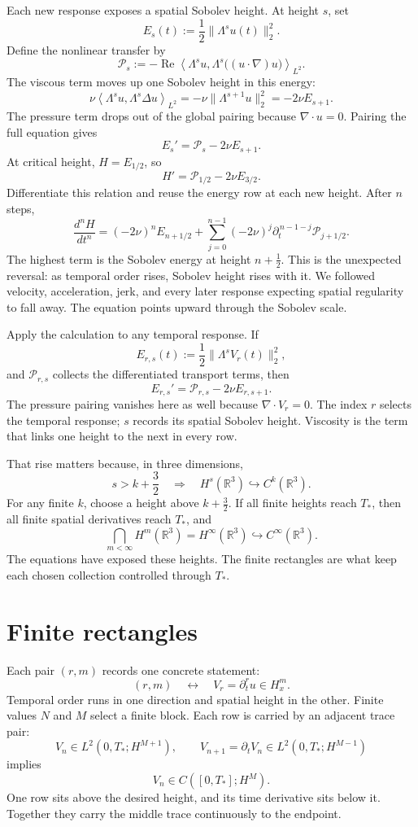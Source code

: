 \documentclass[12pt]{article}
\newcommand{\R}{\mathbb R}
\begin{document}
Each new response exposes a spatial Sobolev height. At height \(s\), set
\[
  E_s(t):=\frac12\|\Lambda^su(t)\|_2^2.
\]
Define the nonlinear transfer by
\[
  \mathcal P_s
  :=
  -\operatorname{Re}
  \left\langle
    \Lambda^su,
    \Lambda^s\bigl((u\cdot\nabla)u\bigr)
  \right\rangle_{L^2}.
\]
The viscous term moves up one Sobolev height in this energy:
\[
  \nu\left\langle\Lambda^su,\Lambda^s\Delta u\right\rangle_{L^2}
  =
  -\nu\|\Lambda^{s+1}u\|_2^2
  =
  -2\nu E_{s+1}.
\]
The pressure term drops out of the global pairing because \(\nabla\cdot u=0\).
Pairing the full equation gives
\[
  E_s'=\mathcal P_s-2\nu E_{s+1}.
\]
At critical height, \(H=E_{1/2}\), so
\[
  H'=\mathcal P_{1/2}-2\nu E_{3/2}.
\]
Differentiate this relation and reuse the energy row at each new height. After
\(n\) steps,
\[
  \frac{d^nH}{dt^n}
  =
  (-2\nu)^nE_{n+1/2}
  +
  \sum_{j=0}^{n-1}
  (-2\nu)^j
  \partial_t^{\,n-1-j}\mathcal P_{j+1/2}.
\]
The highest term is the Sobolev energy at height \(n+\tfrac12\). This is the
unexpected reversal: as temporal order rises, Sobolev height rises with it. We
followed velocity, acceleration, jerk, and every later response expecting
spatial regularity to fall away. The equation points upward through the Sobolev
scale.

Apply the calculation to any temporal response. If
\[
  E_{r,s}(t):=\frac12\|\Lambda^sV_r(t)\|_2^2,
\]
and \(\mathcal P_{r,s}\) collects the differentiated transport terms, then
\[
  E_{r,s}'
  =
  \mathcal P_{r,s}
  -2\nu E_{r,s+1}.
\]
The pressure pairing vanishes here as well because \(\nabla\cdot V_r=0\).
The index \(r\) selects the temporal response; \(s\) records its spatial
Sobolev height. Viscosity is the term that links one height to the next in every
row.

That rise matters because, in three dimensions,
\[
  s>k+\frac32
  \quad\Longrightarrow\quad
  H^s(\R^3)\hookrightarrow C^k(\R^3).
\]
For any finite \(k\), choose a height above \(k+\tfrac32\). If all finite
heights reach \(T_*\), then all finite spatial derivatives reach \(T_*\), and
\[
  \bigcap_{m<\infty}H^m(\R^3)
  =
  H^\infty(\R^3)
  \hookrightarrow
  C^\infty(\R^3).
\]
The equations have exposed these heights. The finite rectangles are what keep
each chosen collection controlled through \(T_*\).

\section*{Finite rectangles}

Each pair \((r,m)\) records one concrete statement:
\[
  (r,m)
  \quad\longleftrightarrow\quad
  V_r=\partial_t^ru\in H_x^m.
\]
Temporal order runs in one direction and spatial height in the other. Finite
values \(N\) and \(M\) select a finite block. Each row is carried by an adjacent
trace pair:
\[
  V_n\in L^2(0,T_*;H^{M+1}),
  \qquad
  V_{n+1}=\partial_tV_n\in L^2(0,T_*;H^{M-1})
\]
implies
\[
  V_n\in C([0,T_*];H^M).
\]
One row sits above the desired height, and its time derivative sits below it.
Together they carry the middle trace continuously to the endpoint.
\end{document}

